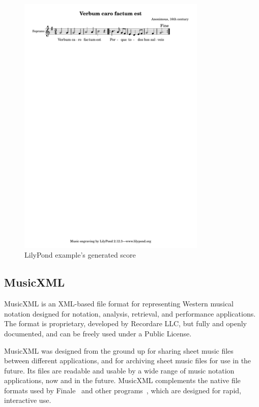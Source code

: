 \vspace{-0.25cm}
\begin{figure}[htb]
  \centering
  \includegraphics[width=0.8\textwidth, clip=true, trim = 9mm 250mm 9mm 6mm]{img/verbum_s1_p1_ly.pdf}
  \caption{LilyPond example's generated score}
  \label{fig:verbum_s1_p1_score_ly}
\end{figure}

\subsection{MusicXML}

MusicXML\cite{musicxml:Online} is an XML-based file format for representing Western musical notation
designed for notation, analysis, retrieval, and performance applications. The format is proprietary,
developed by Recordare LLC, but fully and openly documented, and can be freely used under a Public
License.

MusicXML was designed from the ground up for sharing sheet music files between different
applications, and for archiving sheet music files for use in the future. Its files are readable and
usable by a wide range of music notation applications, now and in the future. MusicXML complements
the native file formats used by Finale~\cite{Finale:Online} and other
programs~\cite{Sibelius:Online}, which are designed for rapid, interactive use.
